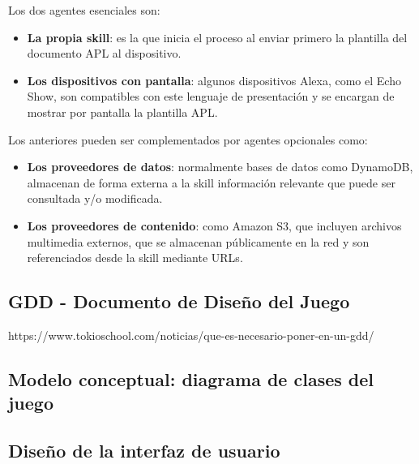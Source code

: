 Los dos agentes esenciales son:
\begin{itemize}
	\item \textbf{La propia skill}: es la que inicia el proceso al enviar primero la plantilla del documento APL al dispositivo.
	\item \textbf{Los dispositivos con pantalla}: algunos dispositivos Alexa, como el Echo Show, son compatibles con este lenguaje de presentación y se encargan de mostrar por pantalla la plantilla APL. 
\end{itemize}

Los anteriores pueden ser complementados por agentes opcionales como: 
\begin{itemize}
	\item \textbf{Los proveedores de datos}: normalmente bases de datos como DynamoDB, almacenan de forma externa a la skill información relevante que puede ser consultada y/o modificada.
	\item \textbf{Los proveedores de contenido}: como Amazon S3, que incluyen archivos multimedia externos, que se almacenan públicamente en la red y son referenciados desde la skill mediante URLs. 
\end{itemize}

\subsection{GDD - Documento de Diseño del Juego}

https://www.tokioschool.com/noticias/que-es-necesario-poner-en-un-gdd/


\subsection{Modelo conceptual: diagrama de clases del juego}

\subsection{Diseño de la interfaz de usuario}



